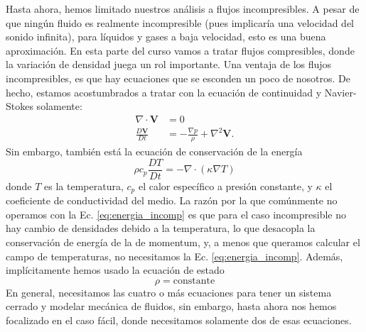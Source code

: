 Hasta ahora, hemos limitado nuestros análisis a flujos incompresibles.
A pesar de que ningún fluido es realmente incompresible (pues implicaría una velocidad del sonido infinita), para líquidos y gases a baja velocidad, esto es una buena aproximación.
En esta parte del curso vamos a tratar flujos compresibles, donde la variación de densidad juega un rol importante.
Una ventaja de los flujos incompresibles, es que hay ecuaciones que se esconden un poco de nosotros.
De hecho, estamos acostumbrados a tratar con la ecuación de continuidad y Navier-Stokes solamente:
%
\begin{align}\label{eq:incompresible}
\nabla\cdot\mathbf{V} &= 0\nonumber\\
\frac{D\mathbf{V}}{D t} &=-\frac{\nabla p}{\rho} +\nabla^2\mathbf{V}.
\end{align}
%
Sin embargo, también está la ecuación de conservación de la energía
%
\begin{equation}\label{eq:energia_incomp}
\rho c_p\frac{DT}{Dt} = -\nabla\cdot (\kappa\nabla T)
\end{equation}
%
donde $T$ es la temperatura, $c_p$ el calor específico a presión constante, y $\kappa$ el coeficiente de conductividad del medio.
La razón por la que comúnmente no operamos con la Ec. \eqref{eq:energia_incomp} es que para el caso incompresible no hay cambio de densidades debido a la temperatura, lo que desacopla la conservación de energía de la de momentum, y, a menos que queramos calcular el campo de temperaturas, no necesitamos la Ec. \eqref{eq:energia_incomp}.
Además, implícitamente hemos usado la ecuación de estado
%
\begin{equation}\label{eq:estado_incomp}
\rho = \text{constante}
\end{equation}
%
En general, necesitamos las cuatro o más ecuaciones para tener un sistema cerrado y modelar mecánica de fluidos, sin embargo, hasta ahora nos hemos focalizado en el caso fácil, donde necesitamos solamente dos de esas ecuaciones.

